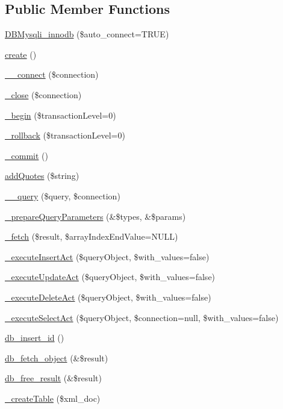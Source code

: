 \subsection*{Public Member Functions}
\begin{DoxyCompactItemize}
\item 
\hyperlink{classDBMysqli__innodb_a0802ef8a893610ae107ca25b77080bcc}{D\+B\+Mysqli\+\_\+innodb} (\$auto\+\_\+connect=T\+R\+UE)
\item 
\hyperlink{classDBMysqli__innodb_a70756f753a255650d67931f06d675608}{create} ()
\item 
\hyperlink{classDBMysqli__innodb_ab6db4cf73da0e11ed0045a07d751e334}{\+\_\+\+\_\+connect} (\$connection)
\item 
\hyperlink{classDBMysqli__innodb_a566f80a95a8b1e84155feb0868a90c84}{\+\_\+close} (\$connection)
\item 
\hyperlink{classDBMysqli__innodb_aeb782ffae3a856c9b5b5d61e569c84f1}{\+\_\+begin} (\$transaction\+Level=0)
\item 
\hyperlink{classDBMysqli__innodb_a1d9fceb6fa47fd0dce5e2ca05635aafc}{\+\_\+rollback} (\$transaction\+Level=0)
\item 
\hyperlink{classDBMysqli__innodb_a0ec5faa054822bd226fa6c404b17e674}{\+\_\+commit} ()
\item 
\hyperlink{classDBMysqli__innodb_aaf7572b62d23465db5d7bba8930004fc}{add\+Quotes} (\$string)
\item 
\hyperlink{classDBMysqli__innodb_a02098642ca57c84b9061172e8a3b8d17}{\+\_\+\+\_\+query} (\$query, \$connection)
\item 
\hyperlink{classDBMysqli__innodb_a0955069ad72c16d2652573e5883f037d}{\+\_\+prepare\+Query\+Parameters} (\&\$types, \&\$params)
\item 
\hyperlink{classDBMysqli__innodb_ae3c56ef21f1ba07dfd602534544e6fc9}{\+\_\+fetch} (\$result, \$array\+Index\+End\+Value=N\+U\+LL)
\item 
\hyperlink{classDBMysqli__innodb_a7f76f4789d2a6b1614345c4c69071546}{\+\_\+execute\+Insert\+Act} (\$query\+Object, \$with\+\_\+values=false)
\item 
\hyperlink{classDBMysqli__innodb_ad45981920c2258e135292b1ffedaecfb}{\+\_\+execute\+Update\+Act} (\$query\+Object, \$with\+\_\+values=false)
\item 
\hyperlink{classDBMysqli__innodb_a3ba692ef0c7a7d89ba5c7deee0fdd601}{\+\_\+execute\+Delete\+Act} (\$query\+Object, \$with\+\_\+values=false)
\item 
\hyperlink{classDBMysqli__innodb_abae8c007e13d7811697dadb3f9ef3930}{\+\_\+execute\+Select\+Act} (\$query\+Object, \$connection=null, \$with\+\_\+values=false)
\item 
\hyperlink{classDBMysqli__innodb_aec47da41558bdf42e9d2fe31c2ce87f2}{db\+\_\+insert\+\_\+id} ()
\item 
\hyperlink{classDBMysqli__innodb_a676cdff9d50d9398c0c2e3f9d50e8c0a}{db\+\_\+fetch\+\_\+object} (\&\$result)
\item 
\hyperlink{classDBMysqli__innodb_a0eb1700db91867677a8f7fa9e2f25298}{db\+\_\+free\+\_\+result} (\&\$result)
\item 
\hyperlink{classDBMysqli__innodb_adea880ad43bc281fbdae806bd25d6cce}{\+\_\+create\+Table} (\$xml\+\_\+doc)
\end{DoxyCompactItemize}
